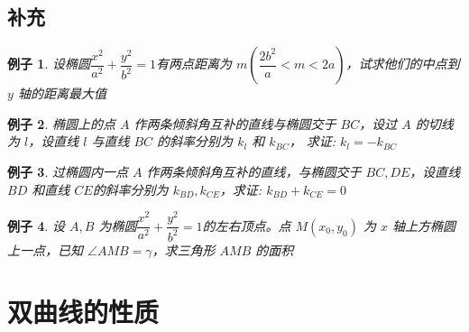 \documentclass[a4paper,10pt,twoside]{article}
\newtheorem{example}{例子}[section]
\begin{document}
\subsection{补充}
\begin{example}
    设椭圆$ \dfrac{x^2}{a^2}+\dfrac{y^2}{b^2}=1 $有两点距离为 $ m(\dfrac{2b^2}{a}<m<2a) $，试求他们的中点到 $ y  $ 轴的距离最大值 
\end{example}
\begin{example}
    椭圆上的点 $ A  $ 作两条倾斜角互补的直线与椭圆交于 $ BC  $，设过 $ A  $ 的切线为 $ l  $，设直线 $ l  $ 与直线 $ BC  $ 的斜率分别为 $ k_l  $ 和 $ k_{BC}  $，
    求证: $ k_l=-k_{BC } $ 
\end{example}
\begin{example}
    过椭圆内一点 $ A  $ 作两条倾斜角互补的直线，与椭圆交于 $ BC,DE  $，设直线 $ BD  $ 和直线 $ CE  $的斜率分别为 $ k_{BD} ,k_{CE}$，求证: $ k_{BD}+k_{CE}=0 $   
\end{example}
\begin{example}
    设 $ A,B  $ 为椭圆$ \dfrac{x^2}{a^2}+\dfrac{y^2}{b^2}=1 $的左右顶点。点 $ M (x_0,y_0 ) $ 为 $ x  $ 轴上方椭圆上一点，已知 $ \angle AMB =\gamma  $，求三角形 $ AMB  $ 的面积
\end{example}
\section{双曲线的性质}
\end{document}
